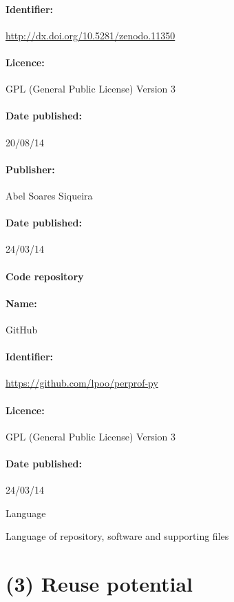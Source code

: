 \documentclass[10pt,a4paper]{article}
\begin{document}
    \paragraph{Identifier:} \url{http://dx.doi.org/10.5281/zenodo.11350}

    \paragraph{Licence:} GPL (General Public License) Version 3

    \paragraph{Date published:} 20/08/14

    \paragraph{Publisher:} Abel Soares Siqueira

    \paragraph{Date published:} 24/03/14

    \paragraph{Code repository}

    \paragraph{Name:} GitHub

    \paragraph{Identifier:} \url{https://github.com/lpoo/perprof-py}

    \paragraph{Licence:} GPL (General Public License) Version 3

    \paragraph{Date published:} 24/03/14

    Language

    Language of repository, software and supporting files

\section*{(3) Reuse potential}

\printbibliography
\end{document}
